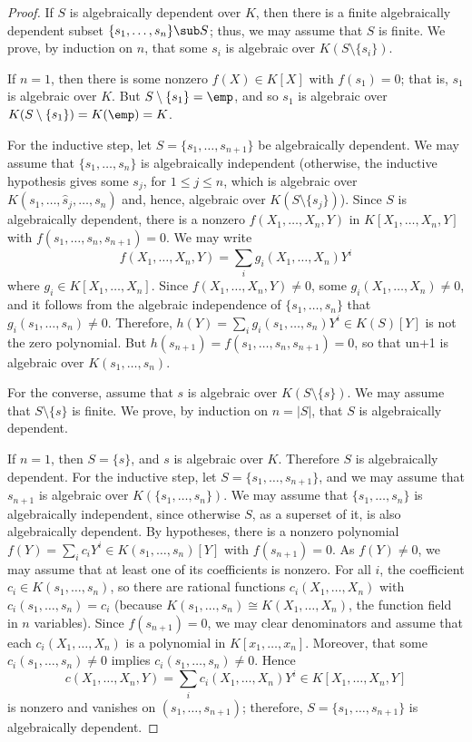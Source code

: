 \begin{proof}
If $S$ is algebraically dependent over $K$, then there is a finite algebraically dependent subset $\{s_1,\dots,s_n\}\sub S$; thus, we may assume that $S$ is finite. We prove, by induction on $n$, that some $s_i$ is algebraic over $K(S\setminus\{s_i\})$.\par
If $n=1$, then there is some nonzero $f(X)\in K[X]$ with $f(s_1)=0$; that is, $s_1$ is algebraic over $K$. But $S\setminus\{s_1\}=\emp$, and so $s_1$ is algebraic over $K(S\setminus\{s_1\})=K(\emp)=K$.\par
For the inductive step, let $S=\{s_1,\dots,s_{n+1}\}$ be algebraically dependent. We may assume that $\{s_1,\dots,s_n\}$ is algebraically independent (otherwise, the inductive hypothesis
gives some $s_j$, for $1\leq j\leq n$, which is algebraic over $K(s_1,\dots,\widehat{s}_j,\dots,s_{n})$ and, hence, algebraic over $K(S\setminus\{s_j\})$). Since $S$ is algebraically dependent, there is a nonzero $f(X_1,\dots,X_n,Y)$ in $K[X_1,\dots,X_n,Y]$ with $f(s_1,\dots,s_n,s_{n+1})=0$. We may write 
\[f(X_1,\dots,X_n,Y)=\sum_ig_i(X_1,\dots,X_n)Y^i\]
where $g_i\in K[X_1,\dots,X_n]$. Since $f(X_1,\dots,X_n,Y)\neq 0$, some $g_i(X_1,\dots,X_n)\neq 0$, and it follows from the algebraic independence of $\{s_1,\dots,s_n\}$ that $g_i(s_1,\dots,s_n)\neq 0$. Therefore, $h(Y)=\sum_ig_i(s_1,\dots,s_n)Y^i\in K(S)[Y]$ is not the zero polynomial. But $h(s_{n+1})=f(s_1,\dots,s_n,s_{n+1})=0$, so that un+1 is algebraic over $K(s_1,\dots,s_n)$.\par
For the converse, assume that $s$ is algebraic over $K(S\setminus\{s\})$. We may assume that $S\setminus\{s\}$ is finite. We prove, by induction on $n=|S|$, that $S$ is algebraically dependent.\par
If $n=1$, then $S=\{s\}$, and $s$ is algebraic over $K$. Therefore $S$ is algebraically dependent. For the inductive step, let $S=\{s_1,\dots,s_{n+1}\}$, and we may assume that $s_{n+1}$ is algebraic over $K(\{s_1,\dots,s_n\})$. We may assume that $\{s_1,\dots,s_n\}$ is algebraically independent, since otherwise $S$, as a superset of it, is also algebraically dependent. By hypotheses, there is a nonzero polynomial $f(Y)=\sum_ic_iY^i\in K(s_1,\dots,s_{n})[Y]$ with $f(s_{n+1})=0$. As $f(Y)\neq 0$, we may assume that at least one of its coefficients is nonzero. For all $i$, the coefficient $c_i\in K(s_1,\dots,s_n)$, so there are rational functions $c_i(X_1,\dots,X_n)$ with $c_i(s_1,\dots,s_n)=c_i$ (because $K(s_1,\dots,s_n)\cong K(X_1,\dots,X_n)$, the function field in $n$ variables). Since $f(s_{n+1})=0$, we may clear denominators and assume that each $c_i(X_1,\dots,X_n)$ is a polynomial in $K[x_1,\dots,x_n]$. Moreover, that some $c_i(s_1,\dots,s_n)\neq 0$ implies $c_i(s_1,\dots,s_n)\neq 0$. Hence
\[c(X_1,\dots,X_n,Y)=\sum_ic_i(X_1,\dots,X_n)Y^i\in K[X_1,\dots,X_n,Y]\]
is nonzero and vanishes on $(s_1,\dots,s_{n+1})$; therefore, $S=\{s_1,\dots,s_{n+1}\}$ is algebraically dependent.
\end{proof}
